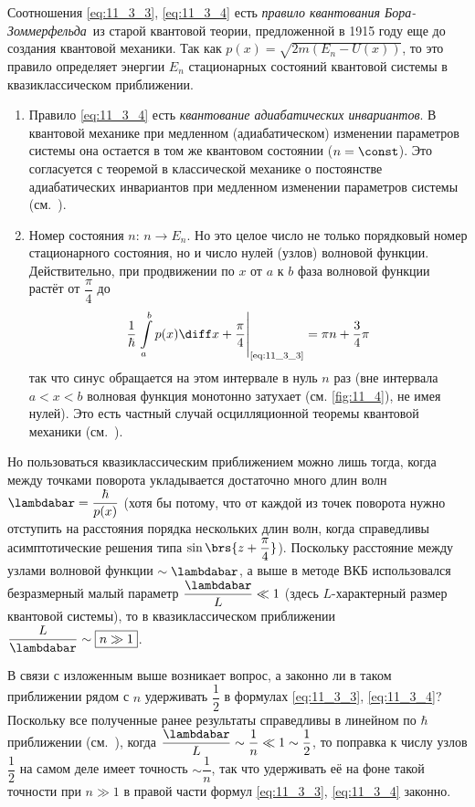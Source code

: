 Соотношения \eqref{eq:11_3_3}, \eqref{eq:11_3_4} есть {\em правило квантования Бора-Зоммерфельда}\footnotemark{}\ из старой квантовой теории, предложенной в 1915 году еще до создания квантовой механики. Так как $p(x) = \sqrt{2m(E_n - U(x))}$, то это правило определяет энергии $E_n$ стационарных состояний квантовой системы в квазиклассическом приближении.

\begin{enumerate}
\item Правило \eqref{eq:11_3_4} есть {\em квантование адиабатических инвариантов}. В квантовой механике при медленном (адиабатическом) изменении параметров системы она остается в том же квантовом состоянии (${n = \const}$). Это согласуется с теоремой в классической механике о постоянстве адиабатических инвариантов при медленном изменении параметров системы (см.~).

\item Номер состояния $n$: $n \to E_n$. Но это целое число не только порядковый номер стационарного состояния, но и число нулей (узлов) волновой функции. Действительно, при продвижении по $x$ от $a$ к $b$ фаза волновой функции растёт от $\dfrac{\pi}{4}$ до
$$
\frac{1}{\hbar} \left. \int \limits_{a}^{b} p(x) \diff x + \frac{\pi}{4} \right|_{\text{\eqref{eq:11_3_3}}} =\pi n + \frac{3}{4}\pi
$$%
%
так что синус обращается на этом интервале в нуль $n$ раз (вне интервала $a < x < b$ волновая функция монотонно затухает (см. \autoref{fig:11_4}), не имея нулей). Это есть частный случай осцилляционной теоремы квантовой механики (см.~).
\end{enumerate}

Но пользоваться квазиклассическим приближением можно лишь тогда, когда между точками поворота укладывается достаточно много длин волн $\lambdabar = \dfrac{\hbar}{p(x)}$ (хотя бы потому, что от каждой из точек поворота нужно отступить на расстояния порядка нескольких длин волн, когда справедливы асимптотические решения типа $\sin \brs{z + \dfrac{\pi}{4}}$). Поскольку расстояние между узлами волновой функции $\sim \lambdabar$, а выше в методе ВКБ использовался безразмерный малый параметр $\dfrac{\lambdabar}{L} \ll 1$ (здесь $L$-характерный размер квантовой системы), то в квазиклассическом приближении $\dfrac{L}{\lambdabar} \sim \boxed{n \gg 1}$.

В связи с изложенным выше возникает вопрос, а законно ли в таком приближении рядом с $n$ удерживать $\dfrac{1}{2}$ в формулах \eqref{eq:11_3_3}, \eqref{eq:11_3_4}? Поскольку все полученные ранее результаты справедливы в линейном по $\hbar$ приближении (см.~), когда $\dfrac{\lambdabar}{L} \sim \dfrac{1}{n} \ll 1 \sim \dfrac{1}{2}$, то поправка к числу узлов $\dfrac{1}{2}$ на самом деле имеет точность $\sim \dfrac{1}{n}$, так что удерживать её на фоне такой точности при $n \gg 1$ в правой части формул \eqref{eq:11_3_3}, \eqref{eq:11_3_4} законно.

